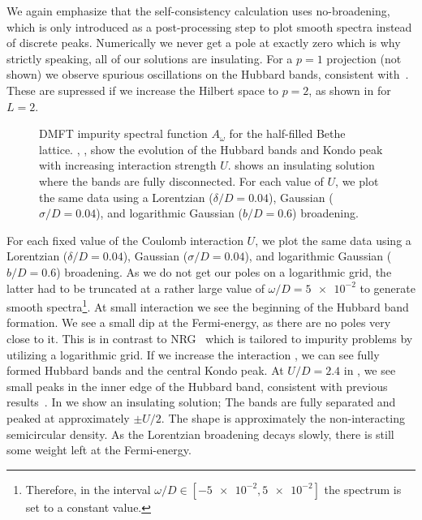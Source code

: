 We again emphasize that the self-consistency calculation uses no-broadening,
which is only introduced as a post-processing step to plot smooth spectra instead of discrete peaks.
Numerically we never get a pole at exactly zero which is why strictly speaking,
all of our solutions are insulating.
For a $p=1$ projection (not shown) we observe spurious oscillations on the Hubbard bands,
consistent with~\cite{Lu2019}.
These are supressed if we increase the Hilbert space to $p=2$,
as shown in  for $L=2$.
\begin{figure}[ht]
    \centering
    
    \caption{
        DMFT impurity spectral function $A_\omega$ for the half-filled Bethe lattice.
        ,
        ,
        show the evolution of the Hubbard bands and Kondo peak
        with increasing interaction strength $U$.
         shows an insulating solution where the bands are
        fully disconnected.
        For each value of $U$,
        we plot the same data using a
        Lorentzian ($\delta/D=0.04$),
        Gaussian ($\sigma/D=0.04$),
        and logarithmic Gaussian ($b/D=0.6$)
        broadening.
    }%
    \label{fig:spectral-function}
\end{figure}
For each fixed value of the Coulomb interaction $U$,
we plot the same data using a
Lorentzian ($\delta/D=0.04$),
Gaussian ($\sigma/D=0.04$),
and logarithmic Gaussian ($b/D=0.6$)
broadening.
As we do not get our poles on a logarithmic grid,
the latter had to be truncated at a rather large value of $\omega/D=\num{5e-2}$
to generate smooth spectra\footnote{
    Therefore,
    in the interval $\omega/D\in[-\num{5e-2}, \num{5e-2}]$ the spectrum is set to a constant value.
}.
At small interaction 
we see the beginning of the Hubbard band formation.
We see a small dip at the Fermi-energy,
as there are no poles very close to it.
This is in contrast to NRG~\cite{Bulla2008} which is tailored to impurity problems by utilizing
a logarithmic grid.
If we increase the interaction ,
we can see fully formed Hubbard bands and the central Kondo peak.
At $U/D=2.4$ in , we see small peaks in the
inner edge of the Hubbard band,
consistent with previous results~\cite{Karski2005,Karski2008,Zitko2009,Gull2010,Granath2012,Granath2014,Ganahl2014,Lu2014,Lu2019,Lee2017}.
In  we show an insulating solution;
The bands are fully separated and peaked at approximately $\pm U/2$.
The shape is approximately the non-interacting semicircular density.
As the Lorentzian broadening decays slowly,
there is still some weight left at the Fermi-energy.

